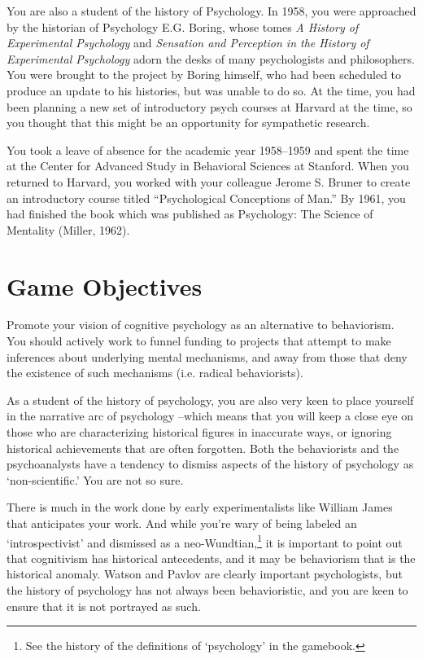 \begin{refsection}
You are also a student of the history of Psychology. In 1958, you were approached by the historian of Psychology E.G. Boring, whose tomes \emph{A History of Experimental Psychology} and \emph{Sensation and Perception in the History of Experimental Psychology} adorn the desks of many psychologists and philosophers. You were brought to the project by Boring himself, who had been scheduled to produce an update to his histories, but was unable to do so. At the time, you had been planning a new set of introductory psych courses at Harvard at the time, so you thought that this might be an opportunity for sympathetic research.

You took a leave of absence for the academic year 1958--1959 and spent the time at the Center for Advanced Study in Behavioral Sciences at Stanford. When you returned to Harvard, you worked with your colleague Jerome S. Bruner to create an introductory course titled ``Psychological Conceptions of Man.'' By 1961, you had finished the book which was published as Psychology: The Science of Mentality (Miller, 1962).

\section{Game Objectives}
\label{gameobjectives}

Promote your vision of cognitive psychology as an alternative to behaviorism. You should actively work to funnel funding to projects that attempt to make inferences about underlying mental mechanisms, and away from those that deny the existence of such mechanisms (i.e. radical behaviorists).

As a student of the history of psychology, you are also very keen to place yourself in the narrative arc of psychology –which means that you will keep a close eye on those who are characterizing historical figures in inaccurate ways, or ignoring historical achievements that are often forgotten. Both the behaviorists and the psychoanalysts have a tendency to dismiss aspects of the history of psychology as `non-scientific.' You are not so sure.

There is much in the work done by early experimentalists like William James that anticipates your work. And while you're wary of being labeled an `introspectivist' and dismissed as a neo-Wundtian,\footnote{See the history of the definitions of `psychology' in the gamebook.} it is important to point out that cognitivism has historical antecedents, and it may be behaviorism that is the historical anomaly. Watson and Pavlov are clearly important psychologists, but the history of psychology has not always been behavioristic, and you are keen to ensure that it is not portrayed as such.


\end{refsection}
